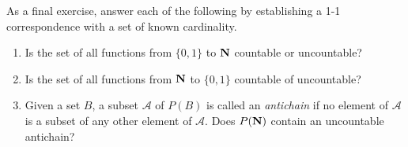 \documentclass{lew98_solutions}
\begin{document}
\begin{exercise}
\label{ex:1.6.10}
    As a final exercise, answer each of the following by establishing a 1-1 correspondence with a set of known cardinality.
    \begin{enumerate}
        \item Is the set of all functions from \( \{ 0, 1 \} \) to \( \mathbf{N} \) countable or uncountable?

        \item Is the set of all functions from \( \mathbf{N} \) to \( \{ 0, 1 \} \) countable of uncountable?

        \item Given a set \( B \), a subset \( \mathcal{A} \) of \( P(B) \) is called an \textit{antichain} if no element of \( \mathcal{A} \) is a subset of any other element of \( \mathcal{A} \). Does \( P(\mathbf{N}) \) contain an uncountable antichain?
    \end{enumerate}
\end{exercise}
\end{document}
